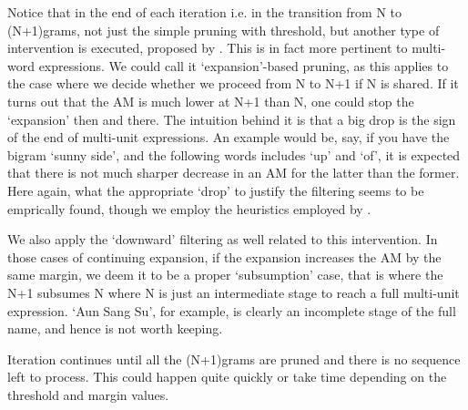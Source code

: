\documentclass{article}
\begin{document}
Notice that in the end of each iteration i.e. in the transition from N to (N+1)grams, not just the simple pruning with threshold, but another type of intervention is executed, proposed by \cite{DuEtAl15}. This is in fact more pertinent to multi-word expressions. We could call it `expansion'-based pruning, as this applies to the case where we decide whether we proceed from N to N+1 if N is shared. If it turns out that the AM is much lower at N+1 than N, one could stop the `expansion' then and there. The intuition behind it is that a big drop is the sign of the end of multi-unit expressions. An example would be, say, if you have the bigram `sunny side', and the following words includes `up' and `of', it is expected that there is not much sharper decrease in an AM for the latter than the former. Here again, what the appropriate `drop' to justify the filtering seems to be emprically found, though we employ the heuristics employed by \cite{DuEtAl15}.

We also apply the `downward' filtering as well related to this intervention. In those cases of continuing expansion, if the expansion increases the AM by the same margin, we deem it to be a proper `subsumption' case, that is where the N+1 subsumes N where N is just an intermediate stage to reach a full multi-unit expression. `Aun Sang Su', for example, is clearly an incomplete stage of the full name, and hence is not worth keeping.

Iteration continues until all the (N+1)grams are pruned and there is no sequence left to process. This could happen quite quickly or take time depending on the threshold and margin values. 
\end{document}
